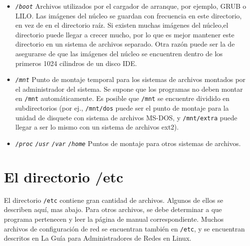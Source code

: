 \begin{itemize}
	
	\item \textit{\texttt{/boot}}
	 Archivos utilizados por el cargador de arranque, por
	ejemplo, GRUB o LILO. Las imágenes del núcleo se guardan con
	frecuencia en este directorio, en vez de en el directorio raíz. Si
	existen 		muchas imágenes del núcleo,el directorio puede
	llegar a crecer mucho, por 		lo que es mejor mantener este
	directorio en un sistema de archivos 			separado. Otra
	razón puede ser la de asegurarse de que las imágenes del núcleo se
	encuentren dentro de los primeros 1024 cilindros de un disco IDE.
	

	
	\item \textit{\texttt{/mnt}}
	 Punto de montaje temporal para los sistemas de archivos
	montados por el administrador del sistema. Se supone que los programas
	no deben montar en \texttt{/mnt} automáticamente. Es posible
	que \texttt{/mnt} se encuentre dividido en subdirectorios
	(por ej., 			\texttt{/mnt/dos} puede ser
	el punto de montaje para la unidad de disquete con sistema de archivos
	MS-DOS, y \texttt{/mnt/extra} puede llegar a ser lo mismo
	con un sistema de archivos ext2).  

	
	\item \textit{\texttt{/proc}
	\texttt{/usr} \texttt{/var}
	\texttt{/home} }  Puntos de
	montaje para otros sistemas de archivos.
	

 \end{itemize}  




\section{ El directorio /etc}

 El directorio \texttt{/etc} contiene gran cantidad de
archivos. Algunos de ellos se describen aquí, mas abajo. Para otros archivos, se
debe determinar a que programa pertenecen y leer la página de manual
correspondiente.  Muchos archivos de configuración de red se encuentran también
en \texttt{/etc}, y se encuentran descritos en La Guía para
Administradores de Redes en Linux.  

